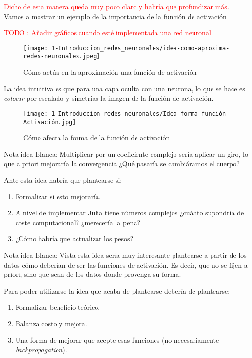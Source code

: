 \textcolor{red}{Dicho de esta manera queda muy poco claro y habría que profundizar más.}
Vamos a mostrar un ejemplo de la importancia de la función de activación 

\textcolor{red}{TODO : Añadir gráficos cuando esté implementada una red neuronal}


\begin{figure}[h!]
    \texttt{[image: 1-Introduccion\_redes\_neuronales/idea-como-aproxima-redes-neuronales.jpeg]}
    \caption{Cómo actúa en la aproximación una función de activación}
    \label{img:idea-como-aproxima-redes-neuronales}
   \end{figure}

La idea intuitiva es que para una capa oculta con una neurona, 
lo que se hace es \textit{colocar} por escalado y simetrías la imagen de la función de activación. 

\begin{figure}[h!]
    \texttt{[image: 1-Introduccion\_redes\_neuronales/Idea-forma-función-Activación.jpg]}
    \caption{Cómo afecta la forma de la función de activación}
    \label{img:como afecta la forma de la función de aproximación}
   \end{figure}

\textcolor{dark_green}{Nota idea Blanca: Multiplicar por un coeficiente complejo sería aplicar un giro,
 lo que a priori mejoraría la convergencia
 ¿Qué pasaría se cambiáramos el cuerpo?}

Ante esta idea habría que plantearse si: 

\begin{enumerate}
    \item Formalizar si esto mejoraría.
    \item A nivel de implementar Julia tiene números complejos ¿cuánto supondría de coste computacional? ¿merecería la pena?
    \item ¿Cómo habría que actualizar los pesos?
\end{enumerate}

\textcolor{dark_green}{Nota idea Blanca: Vista esta idea sería muy interesante plantearse a partir de los datos cómo deberían de ser las funciones de activación. Es decir, que no se fijen a priori, sino que sean de los datos donde provenga su forma.}

Para poder utilizarse la idea que acaba de plantearse debería de plantearse: 
\begin{enumerate}
    \item Formalizar beneficio teórico.
    \item Balanza costo y mejora.
    \item Una forma de mejorar que acepte esas funciones (no necesariamente \textit{backpropagation}).
\end{enumerate}

